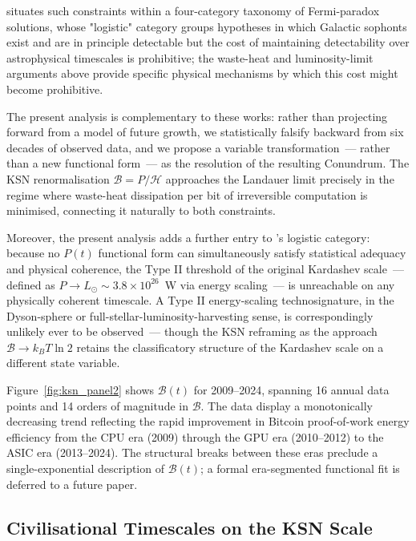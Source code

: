 \documentclass[final,5p,times,twocolumn,authoryear]{elsarticle}
\begin{document}
\citet{Cirkovic2018GreatSilence} situates such constraints within a four-category taxonomy of Fermi-paradox solutions, whose "logistic" category groups hypotheses in which Galactic sophonts exist and are in principle detectable but the cost of maintaining detectability over astrophysical timescales is prohibitive; the waste-heat and luminosity-limit arguments above provide specific physical mechanisms by which this cost might become prohibitive.

The present analysis is complementary to these works: rather than projecting forward from a model of future growth, we statistically falsify backward from six decades of observed data, and we propose a variable transformation~--- rather than a new functional form~--- as the resolution of the resulting Conundrum. The KSN renormalisation $\mathscr{B} = P/\mathcal{H}$ approaches the Landauer limit precisely in the regime where waste-heat dissipation per bit of irreversible computation is minimised, connecting it naturally to both constraints.

Moreover, the present analysis adds a further entry to \citeauthor{Cirkovic2018GreatSilence}'s logistic category: because no $P(t)$ functional form can simultaneously satisfy statistical adequacy and physical coherence, the Type II threshold of the original Kardashev scale~--- defined as $P \to L_\odot \sim 3.8 \times 10^{26}$~W via energy scaling~--- is unreachable on any physically coherent timescale. A Type II energy-scaling technosignature, in the Dyson-sphere or full-stellar-luminosity-harvesting sense, is correspondingly unlikely ever to be observed~--- though the KSN reframing as the approach $\mathscr{B} \to k_{B} T \ln 2$ retains the classificatory structure of the Kardashev scale on a different state variable.
 
Figure~\ref{fig:ksn_panel2} shows $\mathscr{B}(t)$ for 2009--2024, spanning 16 annual
data points and 14 orders of magnitude in $\mathscr{B}$. The data display a
monotonically decreasing trend reflecting the rapid improvement in Bitcoin
proof-of-work energy efficiency from the CPU era (2009) through the GPU era
(2010--2012) to the ASIC era (2013--2024). The structural breaks between
these eras preclude a single-exponential description of $\mathscr{B}(t)$; a formal
era-segmented functional fit is deferred to a future paper.
 
\subsection{Civilisational Timescales on the KSN Scale}
\label{sec:timescales}
 
\end{document}
